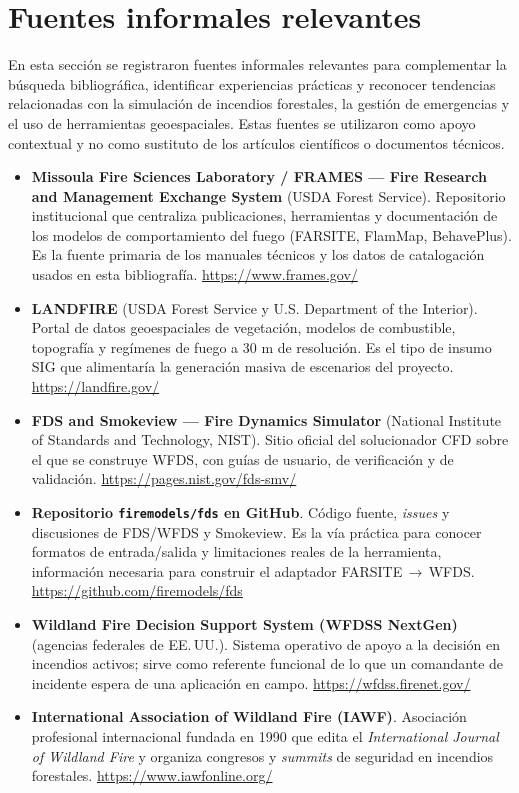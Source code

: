 \clearpage
\section{Fuentes informales relevantes}
En esta sección se registraron fuentes informales relevantes para complementar la búsqueda bibliográfica, identificar experiencias prácticas y reconocer tendencias relacionadas con la simulación de incendios forestales, la gestión de emergencias y el uso de herramientas geoespaciales. Estas fuentes se utilizaron como apoyo contextual y no como sustituto de los artículos científicos o documentos técnicos.
\begin{itemize}
    \item \textbf{Missoula Fire Sciences Laboratory / FRAMES --- Fire Research and Management Exchange System} (USDA Forest Service). Repositorio institucional que centraliza publicaciones, herramientas y documentación de los modelos de comportamiento del fuego (FARSITE, FlamMap, BehavePlus). Es la fuente primaria de los manuales técnicos y los datos de catalogación usados en esta bibliografía. \url{https://www.frames.gov/}
    \item \textbf{LANDFIRE} (USDA Forest Service y U.S. Department of the Interior). Portal de datos geoespaciales de vegetación, modelos de combustible, topografía y regímenes de fuego a 30 m de resolución. Es el tipo de insumo SIG que alimentaría la generación masiva de escenarios del proyecto. \url{https://landfire.gov/}
    \item \textbf{FDS and Smokeview --- Fire Dynamics Simulator} (National Institute of Standards and Technology, NIST). Sitio oficial del solucionador CFD sobre el que se construye WFDS, con guías de usuario, de verificación y de validación. \url{https://pages.nist.gov/fds-smv/}
    \item \textbf{Repositorio \texttt{firemodels/fds} en GitHub}. Código fuente, \emph{issues} y discusiones de FDS/WFDS y Smokeview. Es la vía práctica para conocer formatos de entrada/salida y limitaciones reales de la herramienta, información necesaria para construir el adaptador FARSITE\,$\rightarrow$\,WFDS. \url{https://github.com/firemodels/fds}
    \item \textbf{Wildland Fire Decision Support System (WFDSS NextGen)} (agencias federales de EE.\,UU.). Sistema operativo de apoyo a la decisión en incendios activos; sirve como referente funcional de lo que un comandante de incidente espera de una aplicación en campo. \url{https://wfdss.firenet.gov/}
    \item \textbf{International Association of Wildland Fire (IAWF)}. Asociación profesional internacional fundada en 1990 que edita el \emph{International Journal of Wildland Fire} y organiza congresos y \emph{summits} de seguridad en incendios forestales. \url{https://www.iawfonline.org/}

\end{itemize}
